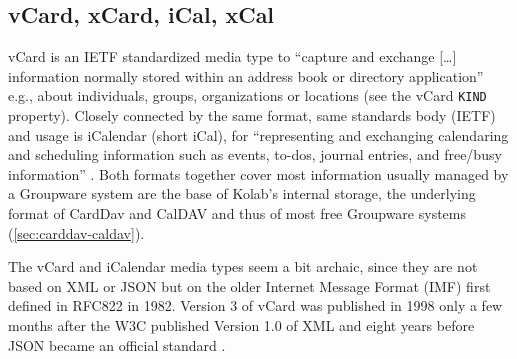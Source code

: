 \documentclass[11pt,a4paper,headsepline,twoside]{scrartcl}		%
\begin{document}


\subsection{vCard, xCard, iCal, xCal}
\label{sec:vcard-xcard-ical}

vCard is an IETF standardized media type to ``capture and exchange [\ldots]
information normally stored within an address book or directory application''
\cite{RFC6350} e.g., about individuals, groups, organizations or locations (see
the vCard \lstinline:KIND: property). Closely connected by the same format, same
standards body (IETF) and usage is iCalendar (short iCal), for ``representing
and exchanging calendaring and scheduling information such as events, to-dos,
journal entries, and free/busy information'' \cite{RFC5545}. Both formats
together cover most information usually managed by a Groupware system are the
base of Kolab's internal storage, the underlying format of CardDav and CalDAV
and thus of most free Groupware systems (\autoref{sec:carddav-caldav}).

The vCard and iCalendar media types seem a bit archaic, since they are not based
on XML or JSON but on the older Internet Message Format \cite{RFC5322} (IMF)
first defined in RFC822 in 1982. Version 3 of vCard was published in 1998
\cite{RFC2425} only a few months after the W3C published Version 1.0 of XML
\cite{Paoli:98:XR} and eight years before JSON became an official standard
\cite{RFC4627}.
\end{document}
